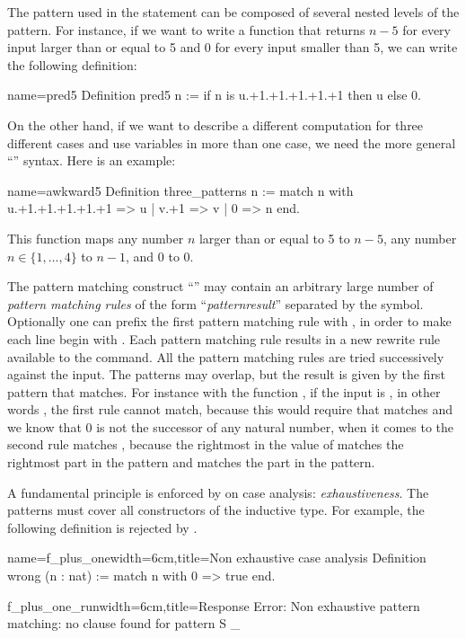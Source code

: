 The pattern used in the  statement can be composed of
several nested levels of the  pattern.  For instance,
if we want to write a function
that returns \(n-5\) for every input larger than or equal to 5 and 0
for every input smaller than 5, we can write the following definition:

\begin{coq}{name=pred5}{}
Definition pred5 n :=
  if n is u.+1.+1.+1.+1.+1 then u else 0.
\end{coq}
On the other hand, if we want to describe a different computation for
three different cases and use variables in more than one case, we need
the more general ``'' syntax.  Here is an
example:

\begin{coq}{name=awkward5}{}
Definition three_patterns n :=
  match n with
    u.+1.+1.+1.+1.+1 => u
  | v.+1 => v
  | 0 => n
  end.
\end{coq}
This function maps any number \(n\) larger than or equal to 5 to \(n-5\),
any number \(n \in \{1, \ldots, 4\}\) to \(n-1\), and \(0\) to \(0\).

The pattern matching construct ``'' may contain an
arbitrary large number of {\em pattern matching rules} of the form
``\emph{pattern}\C{ =>$~$}\emph{result}''
separated by the \C{|} symbol.  Optionally one can
prefix the first pattern matching rule with \C{|}, in order to make each line
begin with \C{|}. Each pattern matching rule results in a new rewrite
rule available to the  command.
All
the pattern matching rules are tried successively against the input.  The
patterns may overlap, but the result is given by the first pattern that
matches.
For instance with the function , if the input is
, in other words , the first
rule cannot match, because this would require that  matches
 and we know that \(0\) is not the successor of any
natural number, when it comes to the second rule  matches
, because the rightmost  in the value of  matches
the rightmost  part in the pattern and  matches the  part
in the pattern.

A fundamental principle is enforced by \Coq{} on case analysis:
\emph{exhaustiveness}.  The patterns must cover all constructors of
the inductive type.  For example, the following definition is
rejected by \Coq{}.

\begin{coq}{name=f_plus_one}{width=6cm,title=Non exhaustive case analysis}
Definition wrong (n : nat) :=
  match n with 0 => true end.
$~$
\end{coq}
\begin{coqout}{f_plus_one_run}{width=6cm,title=Response}
Error: Non exhaustive pattern
matching: no clause found for
pattern S _
\end{coqout}


